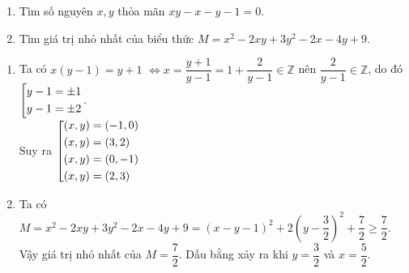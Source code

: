 \begin{ex}%
    \hfill
    \begin{enumerate}
        \item Tìm số nguyên $x,y$ thỏa mãn $xy-x-y-1=0$.
        \item  Tìm giá trị nhỏ nhất của biểu thức $M=x^2-2xy+3y^2-2x-4y+9$.
    \end{enumerate}
\loigiai
    {
\begin{enumerate}
        \item Ta có $x(y-1)=y+1$ $\Leftrightarrow x=\dfrac{y+1}{y-1}=1+\dfrac{2}{y-1} \in \mathbb{Z}$ nên $\dfrac{2}{y-1} \in \mathbb{Z}$, do đó $\left[\begin{aligned}y-1&=\pm 1\\ y-1&= \pm 2 \end{aligned}\right.$.\\
        Suy ra $\left[\begin{aligned}(x,y)&=(-1,0)\\(x,y)&=(3,2)\\(x,y)&=(0,-1)\\(x,y)&=(2,3)\end{aligned}\right.$
        \item  Ta có $M=x^2-2xy+3y^2-2x-4y+9=(x-y-1)^2+2\left(y-\dfrac{3}{2}\right)^2+\dfrac{7}{2} \geq \dfrac{7}{2}$. \\Vậy giá trị nhỏ nhất của $M=\dfrac{7}{2}$.
        Dấu bằng xảy ra khi $y=\dfrac{3}{2}$ và $x=\dfrac{5}{2}$.
    \end{enumerate}
    
    }
\end{ex}

